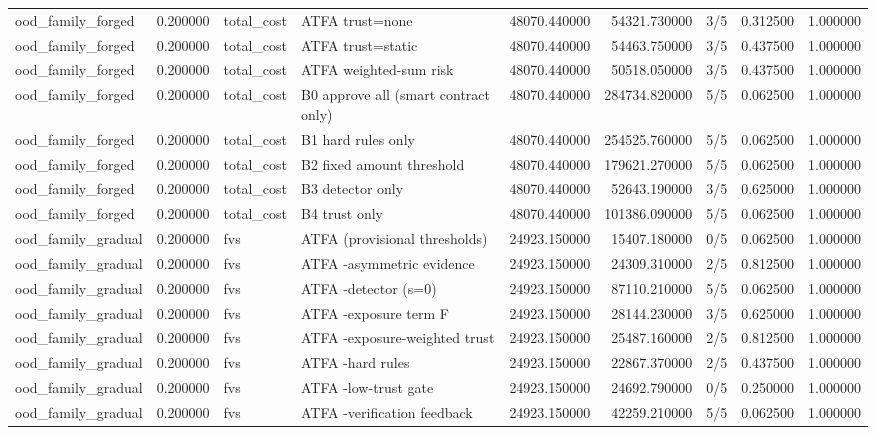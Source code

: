 \begin{tabular}{lrllrrlrr}
ood\_family\_forged & 0.200000 & total\_cost & ATFA trust=none & 48070.440000 & 54321.730000 & 3/5 & 0.312500 & 1.000000 \\
ood\_family\_forged & 0.200000 & total\_cost & ATFA trust=static & 48070.440000 & 54463.750000 & 3/5 & 0.437500 & 1.000000 \\
ood\_family\_forged & 0.200000 & total\_cost & ATFA weighted-sum risk & 48070.440000 & 50518.050000 & 3/5 & 0.437500 & 1.000000 \\
ood\_family\_forged & 0.200000 & total\_cost & B0 approve all (smart contract only) & 48070.440000 & 284734.820000 & 5/5 & 0.062500 & 1.000000 \\
ood\_family\_forged & 0.200000 & total\_cost & B1 hard rules only & 48070.440000 & 254525.760000 & 5/5 & 0.062500 & 1.000000 \\
ood\_family\_forged & 0.200000 & total\_cost & B2 fixed amount threshold & 48070.440000 & 179621.270000 & 5/5 & 0.062500 & 1.000000 \\
ood\_family\_forged & 0.200000 & total\_cost & B3 detector only & 48070.440000 & 52643.190000 & 3/5 & 0.625000 & 1.000000 \\
ood\_family\_forged & 0.200000 & total\_cost & B4 trust only & 48070.440000 & 101386.090000 & 5/5 & 0.062500 & 1.000000 \\
ood\_family\_gradual & 0.200000 & fvs & ATFA (provisional thresholds) & 24923.150000 & 15407.180000 & 0/5 & 0.062500 & 1.000000 \\
ood\_family\_gradual & 0.200000 & fvs & ATFA -asymmetric evidence & 24923.150000 & 24309.310000 & 2/5 & 0.812500 & 1.000000 \\
ood\_family\_gradual & 0.200000 & fvs & ATFA -detector (s=0) & 24923.150000 & 87110.210000 & 5/5 & 0.062500 & 1.000000 \\
ood\_family\_gradual & 0.200000 & fvs & ATFA -exposure term F & 24923.150000 & 28144.230000 & 3/5 & 0.625000 & 1.000000 \\
ood\_family\_gradual & 0.200000 & fvs & ATFA -exposure-weighted trust & 24923.150000 & 25487.160000 & 2/5 & 0.812500 & 1.000000 \\
ood\_family\_gradual & 0.200000 & fvs & ATFA -hard rules & 24923.150000 & 22867.370000 & 2/5 & 0.437500 & 1.000000 \\
ood\_family\_gradual & 0.200000 & fvs & ATFA -low-trust gate & 24923.150000 & 24692.790000 & 0/5 & 0.250000 & 1.000000 \\
ood\_family\_gradual & 0.200000 & fvs & ATFA -verification feedback & 24923.150000 & 42259.210000 & 5/5 & 0.062500 & 1.000000 \\

\end{tabular}

